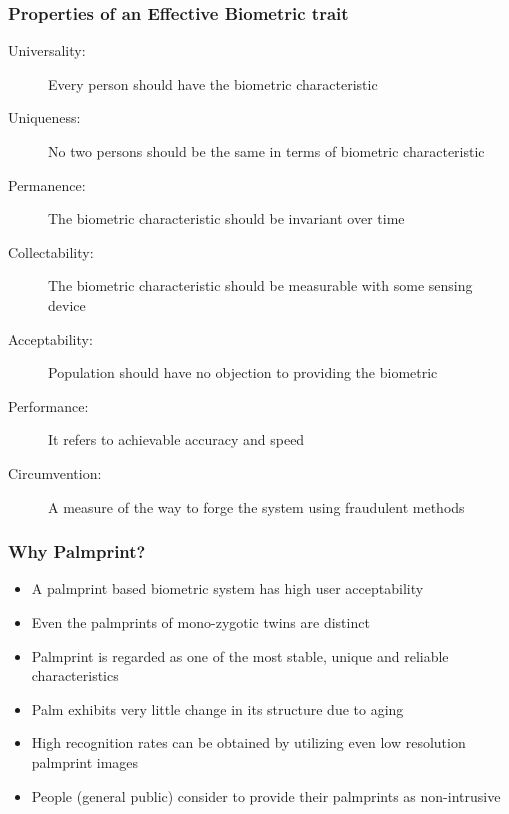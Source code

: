\documentclass{beamer}
\begin{document}
\begin{frame}
\frametitle{Properties of an Effective Biometric trait}
\begin{description}
	\item [Universality: ]Every person should have the biometric characteristic
	\item [Uniqueness: ]No two persons should be the same in terms of biometric characteristic
	\item [Permanence: ]The biometric characteristic should be invariant over time
	\item [Collectability: ]The biometric characteristic should be measurable with some sensing device
	\item [Acceptability: ]Population should have no objection to providing the biometric
	\item [Performance: ]It refers to achievable accuracy and speed
	\item [Circumvention: ]A measure of the way to forge the system using fraudulent methods
\end{description}
\end{frame}

\begin{frame}
\frametitle{Why Palmprint?}
\begin{itemize}
	\item A palmprint based biometric system has high user acceptability
	\item Even the palmprints of mono-zygotic twins are distinct
	\item Palmprint is regarded as one of the most stable, unique and reliable characteristics 
	\item Palm exhibits very little change in its structure due to aging
	\item High recognition rates can be obtained by utilizing even low resolution palmprint images
	\item People (general public) consider to provide their palmprints as non-intrusive
\end{itemize}
\end{frame}
\end{document}
